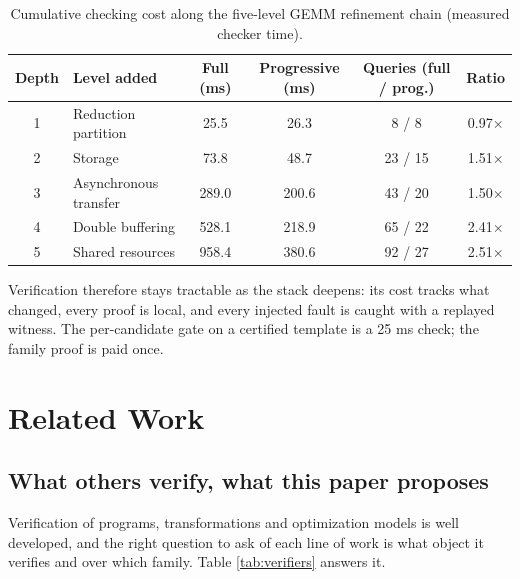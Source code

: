 \documentclass[11pt]{article}
\begin{document}
\begin{table}[tb]
\small
\centering
\begin{tabular}{@{}clcccc@{}}
\toprule
Depth & Level added & Full (ms) & Progressive (ms) & Queries (full / prog.) & Ratio \\
\midrule
1 & Reduction partition & 25.5 & 26.3 & 8 / 8 & 0.97\(\times\) \\
2 & Storage & 73.8 & 48.7 & 23 / 15 & 1.51\(\times\) \\
3 & Asynchronous transfer & 289.0 & 200.6 & 43 / 20 & 1.50\(\times\) \\
4 & Double buffering & 528.1 & 218.9 & 65 / 22 & 2.41\(\times\) \\
5 & Shared resources & 958.4 & 380.6 & 92 / 27 & 2.51\(\times\) \\
\bottomrule
\end{tabular}
\caption{Cumulative checking cost along the five-level GEMM refinement chain (measured checker time).}
\label{tab:chain}
\end{table}

Verification therefore stays tractable as the stack deepens: its cost tracks what changed, every proof is local, and every injected fault is caught with a replayed witness. The per-candidate gate on a certified template is a 25 ms check; the family proof is paid once.

\section{Related Work}\label{sec:related}

\subsection{What others verify, what this paper proposes}

Verification of programs, transformations and optimization models is well developed, and the right question to ask of each line of work is what object it verifies and over which family. Table \ref{tab:verifiers} answers it.
\end{document}
